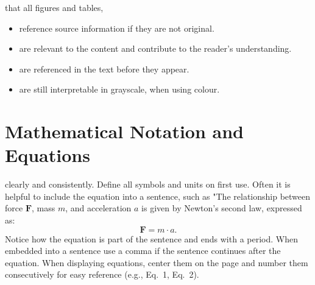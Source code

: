 \documentclass{../sharedAssets/tufte}
\begin{document}

 that all figures and tables,
\begin{itemize}
  \item reference source information if they are not original.
  \item are relevant to the content and contribute to the reader's understanding.
  \item are referenced in the text before they appear.
  \item are still interpretable in grayscale, when using colour.
\end{itemize} 


\vfill
\section{Mathematical Notation and Equations}


 clearly and consistently. Define all symbols and units on first use. Often it is helpful to include the equation into a sentence,
such as "The relationship between force $\textbf{F}$, mass $m$, and acceleration $a$ is given by Newton's second law, expressed as:
\begin{equation}
  \textbf{F} = m \cdot a.
\end{equation}
Notice how the equation is part of the sentence and ends with a period. When embedded into a sentence use a comma if the sentence continues after the equation.
When displaying equations, center them on the page and number them consecutively for easy reference (e.g., Eq.~1, Eq.~2).
\end{document}

